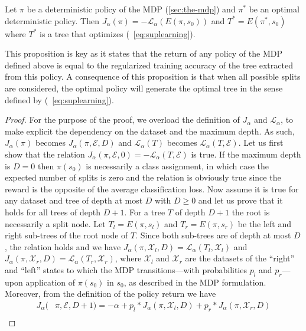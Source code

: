 \begin{proposition}\label{prop:equiv}
Let $\pi$ be a deterministic policy of the MDP (\ref{sec:the-mdp}) and $\pi^*$ be an optimal deterministic policy. 
Then $J_\alpha(\pi) = -{\mathcal L}_\alpha(E(\pi, s_0))$ and $T^* = E(\pi^*, s_0)$ where $T^*$ is a tree that optimizes (~\ref{eq:suplearning}).
\end{proposition}
This proposition is key as it states that the return of any policy of the MDP defined above is equal to the regularized training accuracy of the tree extracted from this policy.
A consequence of this proposition is that when all possible splits are considered, the optimal policy will generate the optimal tree in the sense defined by (~\eqref{eq:suplearning}).

\begin{proof}
For the purpose of the proof, we overload the definition of $J_\alpha$ and $\mathcal L_\alpha$, to make explicit the dependency on the dataset and the maximum depth. 
As such, $J_\alpha(\pi)$ becomes $J_\alpha(\pi, {\mathcal E}, D)$ and ${\mathcal L}_\alpha(T)$ becomes ${\mathcal L}_\alpha(T, {\mathcal E})$. 
Let us first show that the relation $J_\alpha(\pi, {\mathcal E}, 0) = -{\mathcal L}_\alpha(T, {\mathcal E})$ is true. 
If the maximum depth is $D = 0$ then $\pi(s_0)$ is necessarily a class assignment, in which case the expected number of splits is zero and the relation is obviously true since the reward is the opposite of the average classification loss. 
Now assume it is true for any dataset and tree of depth at most $D$ with $D \geq 0$ and let us prove that it holds for all trees of depth $D + 1$. 
For a tree $T$ of depth $D + 1$ the root is necessarily a split node. Let $T_l = E(\pi, s_l)$ and $T_r = E(\pi, s_r)$ be the left and right sub-trees of the root node of $T$. 
Since both sub-trees are of depth at most $D$, the relation holds and we have $J_\alpha(\pi, \mathcal{X}_l, D) = {\mathcal L}_\alpha(T_l, \mathcal{X}_l)$ and $J_\alpha(\pi, \mathcal{X}_r, D) = {\mathcal L}_\alpha(T_r, \mathcal{X}_r)$, where $\mathcal{X}_l$ and $\mathcal{X}_r$ are the datasets of the ``right'' and ``left'' states to which the MDP transitions---with probabilities $p_l$ and $p_r$---upon application of $\pi(s_0)$ in $s_0$, as described in the MDP formulation. 
Moreover, from the definition of the policy return we have 
\begin{align*}
   J_\alpha(&\pi, {\mathcal E}, D + 1) = -\alpha + p_l * J_\alpha(\pi, \mathcal{X}_l, D) + p_r * J_\alpha(\pi, \mathcal{X}_r, D)\\

\end{align*}
\end{proof}

